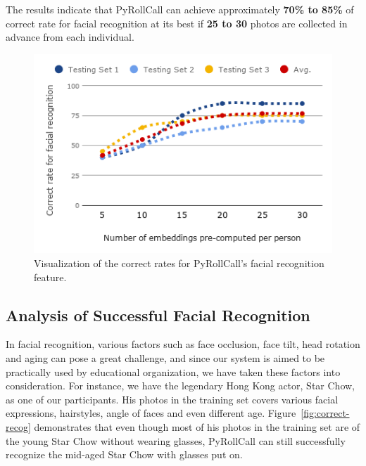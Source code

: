 The results indicate that PyRollCall can achieve approximately \textbf{70\% to 85\%} of correct rate
for facial recognition at its best if \textbf{25 to 30} photos are collected in advance from each individual.
\vspace{0.5cm}

\begin{figure}[!htb]
  \centering
  \includegraphics[width=0.8\linewidth]{figures/exp-result-chart.png}
  \caption{Visualization of the correct rates for PyRollCall's facial recognition feature.}
  \label{fig:exp-result-chart}
\end{figure}



\subsection{Analysis of Successful Facial Recognition}
In facial recognition, various factors such as face occlusion, face tilt, head rotation and aging
can pose a great challenge, and since our system is aimed to be practically used by educational
organization, we have taken these factors into consideration.
For instance, we have the legendary Hong Kong actor, Star Chow, as one of our participants. His photos
in the training set covers various facial expressions, hairstyles, angle of faces and even different age.
Figure~\ref{fig:correct-recog} demonstrates that even though most of his photos in the training set
are of the young Star Chow without wearing glasses, PyRollCall can still successfully recognize
the mid-aged Star Chow with glasses put on.


